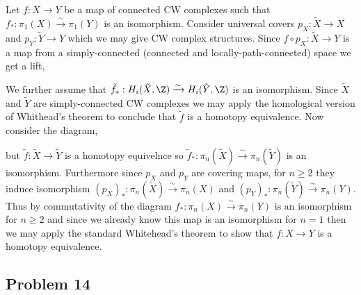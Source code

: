 \documentclass[12pt]{extarticle}
\begin{document}
Let $f : X \to Y$ be a map of connected CW complexes such that $f_* : \pi_1(X) \xrightarrow{\sim} \pi_1(Y)$ is an isomorphism. Consider universal covers $p_X : \tilde{X} \to X$ and $p_Y : \tilde{Y} \to Y$  which we may give CW complex structures. Since $f \circ p_X : \tilde{X} \to Y$ is a map from a simply-connected (connected and locally-path-connected) space we get a lift,
\begin{center}
\end{center}
We further assume that $\tilde{f}_* : H_i(\tilde{X}, \Z) \xrightarrow{\sim} H_i(\tilde{Y}, \Z)$ is an isomorphism. Since $\tilde{X}$ and $\tilde{Y}$ are simply-connected CW complexes we may apply the homological version of Whithead's theorem to conclude that $\tilde{f}$ is a homotopy equivalence. Now consider the diagram,
\begin{center}
\end{center}
but $\tilde{f} : \tilde{X} \to \tilde{Y}$ is a homotopy equivelnce so $\tilde{f}_* : \pi_n(\tilde{X}) \xrightarrow{\sim} \pi_n(\tilde{Y})$ is an isomorphism. Furthermore since $p_X$ and $p_Y$ are covering maps, for $n \ge 2$ they induce isomorphism $(p_X)_* : \pi_n(\tilde{X}) \xrightarrow{\sim} \pi_n(X)$ and $(p_Y)_* : \pi_n(\tilde{Y}) \xrightarrow{\sim} \pi_n(Y)$. Thus by commutativity of the diagram $f_* : \pi_n(X) \xrightarrow{\sim} \pi_n(Y)$ is an isomorphism for $n \ge 2$ and since we already know this map is an isomorphism for $n = 1$ then we may apply the standard Whitehead's theorem to show that $f : X \to Y$ is a homotopy equivalence. 
 
\subsection{Problem 14}
\end{document}
